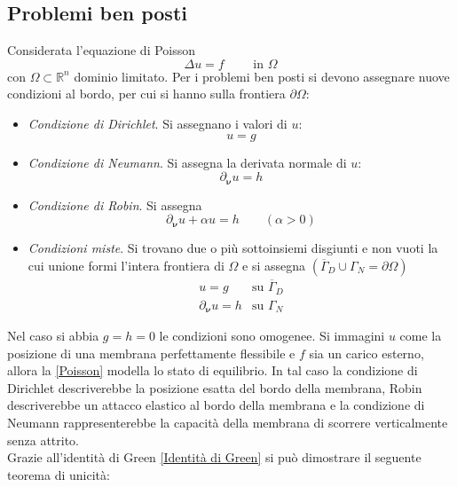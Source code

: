 \documentclass[a4paper,12pt, draft]{article}
\theoremstyle{break}
\numberwithin{equation}{section}
\begin{document}
\subsection{Problemi ben posti}
Considerata l'equazione di Poisson
\[
  \Delta u = f \qquad \mbox{ in } \Omega
\]
con \(\Omega \subset \mathbb{R}^n\) dominio limitato. 
Per i problemi ben posti si devono assegnare nuove condizioni al bordo, per cui si hanno sulla frontiera \(\partial \Omega\):
\begin{itemize}
  \item \emph{Condizione di Dirichlet}. Si assegnano i valori di \(u\):
  \begin{equation}
    u = g
  \end{equation}
  \item \emph{Condizione di Neumann}. Si assegna la derivata normale di \(u\):
  \begin{equation}
    \partial_{\bm\nu} u = h
  \end{equation}
  \item \emph{Condizione di Robin}. Si assegna 
  \begin{equation}
    \partial_{\bm{\nu}}u+\alpha u = h \qquad (\alpha > 0)
  \end{equation}
  \item \emph{Condizioni miste}. Si trovano due o più sottoinsiemi disgiunti e non vuoti la cui unione formi l'intera frontiera di \(\Omega\) e si assegna \((\overline{\Gamma}_D \cup \Gamma_N = \partial \Omega)\)
  \begin{equation}
    \begin{array}{cc}
      u=g & \mbox{su } \overline{\Gamma}_D \\
      \partial_{\bm{\nu}}u=  h & \mbox{su }\Gamma_N
    \end{array}
  \end{equation}
\end{itemize}
Nel caso si abbia \(g = h = 0\) le condizioni sono omogenee. Si immagini \(u\) come la posizione di una membrana perfettamente flessibile e \(f\) sia un carico esterno, allora la \eqref{Poisson} modella lo stato di equilibrio. In tal caso la condizione di Dirichlet descriverebbe la posizione esatta del bordo della membrana, Robin descriverebbe un attacco elastico al bordo della membrana e la condizione di Neumann rappresenterebbe la capacità della membrana di scorrere verticalmente senza attrito. \\
Grazie all'identità di Green \eqref{Identità di Green} si può dimostrare il seguente teorema di unicità:
\end{document}
